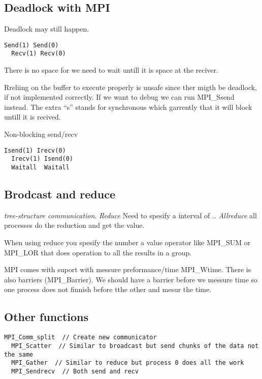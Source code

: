 \subsection{Deadlock with MPI}
Deadlock may still happen.

\begin{BVerbatim}[baseline=c]
  Send(1) Send(0)
  Recv(1) Recv(0)
\end{BVerbatim}
There is no space for we need to wait untill it is space at the reciver.

Rreliing on the buffer to execute properly is unsafe since ther migth be deadlock, if not implemented
correctly. If we want to debug we can run MPI\_Ssend instead. The extra ``s'' stands for synchronous
which garrently that it will block untill it is recived.

Non-blocking send/recv

\begin{BVerbatim}[baseline=c]
  Isend(1) Irecv(0)
  Irecv(1) Isend(0) 
  Waitall  Waitall
\end{BVerbatim}

\subsection{Brodcast and reduce}
\textit{tree-structure communication}.
\textit{Reduce} Need to spesify a interval of ..
\textit{Allreduce} all processes do the reduction and get the value.

When using reduce you spesify the number a value operator like MPI\_SUM or MPI\_LOR that does operation
to all the results in a group.

MPI comes with suport with messure preformance/time MPI\_Wtime. There is also barriers (MPI\_Barrier). We should have a barrier before we messure time so one process does not finnish before tthe other and mesur the time.

\subsection{Other functions}
\begin{BVerbatim}[baseline=c]
  MPI_Comm_split  // Create new communicator
  MPI_Scatter  // Similar to broadcast but send chunks of the data not the same
  MPI_Gather  // Similar to reduce but process 0 does all the work
  MPI_Sendrecv  // Both send and recv 
\end{BVerbatim}
